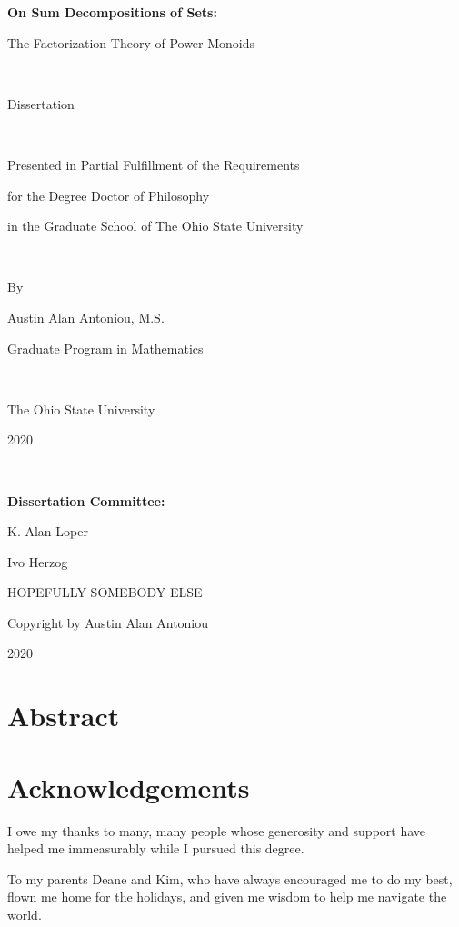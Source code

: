 \frontmatter

\begin{titlepage}
\begin{center}
	{\LARGE \bf On Sum Decompositions of Sets: \\ \vspace{3mm}
		
		The Factorization Theory of Power Monoids}

\

	Dissertation

\
	
	Presented in Partial Fulfillment of the Requirements 
	
	for the Degree Doctor of Philosophy 
	
	in the Graduate School of The Ohio State University

\
		
	By 
	
	{\large Austin Alan Antoniou, M.S. 
	
	Graduate Program in Mathematics}

\
	
	The Ohio State University
	
	2020

\

	{\large {\bf Dissertation Committee:}
	
	K. Alan Loper
	
	Ivo Herzog
	
	HOPEFULLY SOMEBODY ELSE}
\end{center}

\end{titlepage}
\hspace{0pt}
\vfill
\begin{center}
{\Large Copyright by Austin Alan Antoniou

2020}
\end{center}
\vfill
\pagestyle{empty}
\chapter{Abstract}

\chapter{Acknowledgements}
I owe my thanks to many, many people whose generosity and support have helped me immeasurably while I pursued this degree.

To my parents Deane and Kim, who have always encouraged me to do my best, flown me home for the holidays, and given me wisdom to help me navigate the world.

